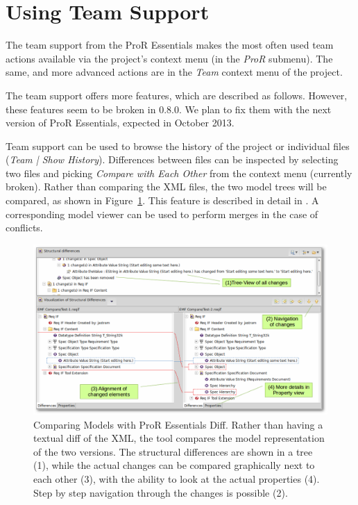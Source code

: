 \documentclass{template/openetcs_report}
\begin{document}
\section{Using Team Support}

The team support from the ProR Essentials makes the most often used team actions available via the project's context menu (in the \emph{ProR} submenu).  The same, and more advanced actions are in the \emph{Team} context menu of the project.

The team support offers more features, which are described as follows.  However, these features seem to be broken in 0.8.0.  We plan to fix them with the next version of ProR Essentials, expected in October 2013.

Team support can be used to browse the history of the project or individual files (\emph{Team | Show History}).  Differences between files can be inspected by selecting two files and picking \emph{Compare with Each Other} from the context menu (currently broken).  Rather than comparing the XML files, the two model trees will be compared, as shown in Figure~\ref{fig:model-diff}.  This feature is described in detail in \cite{essentials_diff}.  A corresponding model viewer can be used to perform merges in the case of conflicts.

\begin{figure}
	\begin{center}
	\includegraphics[width=.8\textwidth]{img/model-diff.png}
	\end{center}
	\caption[Comparing Models with ProR Essentials Diff.]{Comparing Models with ProR Essentials Diff.  Rather than having a textual diff of the XML, the tool compares the model representation of the two versions.  The structural differences are shown in a tree (1), while the actual changes can be compared graphically next to each other (3), with the ability to look at the actual properties (4).  Step by step navigation through the changes is possible (2).}
	\label{fig:model-diff}
\end{figure}
\end{document}
